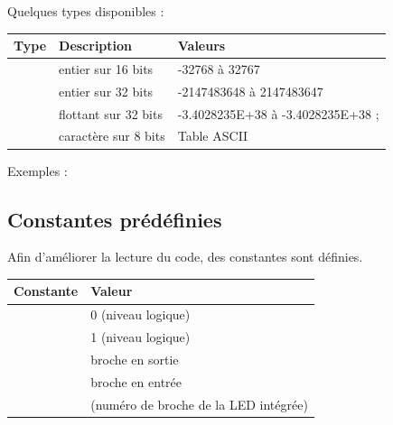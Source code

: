 \documentclass[a4paper,10pt,french]{book}
\begin{document}
Quelques types disponibles :


\begin{savenotes}\sphinxattablestart
\centering
\begin{tabulary}{\linewidth}[t]{|T|T|T|}
\hline
\sphinxstyletheadfamily 
Type
&\sphinxstyletheadfamily 
Description
&\sphinxstyletheadfamily 
Valeurs
\\
\hline
{}
&
entier sur 16 bits
&
-32768 à 32767
\\
\hline
{}
&
entier sur 32 bits
&
-2147483648 à 2147483647
\\
\hline
{}
&
flottant sur 32 bits
&
-3.4028235E+38 à -3.4028235E+38 ;
\\
\hline
{}
&
caractère sur 8 bits
&
Table ASCII
\\
\hline
\end{tabulary}
\par
\sphinxattableend\end{savenotes}

Exemples :

\begin{sphinxVerbatim}[commandchars=\\\{\}]
   
   
   
\end{sphinxVerbatim}


\subsection{Constantes prédéfinies}
\label{\detokenize{2_arduino/5_particularite_langage:constantes-predefinies}}
Afin d’améliorer la lecture du code, des constantes sont définies.


\begin{savenotes}\sphinxattablestart
\centering
\begin{tabulary}{\linewidth}[t]{|T|T|}
\hline
\sphinxstyletheadfamily 
Constante
&\sphinxstyletheadfamily 
Valeur
\\
\hline
{}
&
0 (niveau logique)
\\
\hline
{}
&
1 (niveau logique)
\\
\hline
{}
&
broche en sortie
\\
\hline
{}
&
broche en entrée
\\
\hline
{}
&
 (numéro de broche de la LED intégrée)
\\
\hline
\end{tabulary}
\par
\sphinxattableend\end{savenotes}
\end{document}
